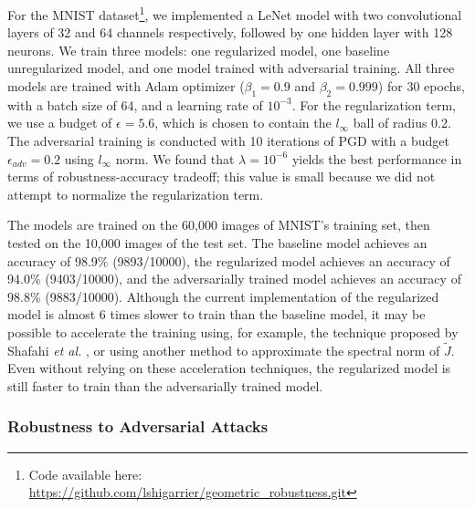 \documentclass[entropy,article,submit,pdftex,moreauthors]{Definitions/mdpi}
\theoremstyle{plain}
\theoremstyle{definition}
\begin{document}
For the MNIST dataset\footnote{Code available here: \url{https://github.com/lshigarrier/geometric_robustness.git}}, we implemented a LeNet model with two convolutional layers of 32 and 64 channels respectively, followed by one hidden layer with 128 neurons. We train three models: one regularized model, one baseline unregularized model, and one model trained with adversarial training. All three models are trained with Adam optimizer ($\beta_1=0.9$ and $\beta_2=0.999$) for 30 epochs, with a batch size of 64, and a learning rate of $10^{-3}$. For the regularization term, we use a budget of $\epsilon=5.6$, which is chosen to contain the $l_\infty$ ball of radius 0.2. The adversarial training is conducted with 10 iterations of PGD with a budget $\epsilon_{adv}=0.2$ using $l_\infty$ norm. We found that $\lambda = 10^{-6}$ yields the best performance in terms of robustness-accuracy tradeoff; this value is small because we did not attempt to normalize the regularization term.


The models are trained on the 60,000 images of MNIST's training set, then tested on the 10,000 images of the test set. The baseline model achieves an accuracy of 98.9\% (9893/10000), the regularized model achieves an accuracy of 94.0\% (9403/10000), and the adversarially trained model achieves an accuracy of 98.8\% (9883/10000). Although the current implementation of the regularized model is almost 6 times slower to train than the baseline model, it may be possible to accelerate the training using, for example, the technique proposed by Shafahi \emph{et al.} \citep{shafahiAdversarialTrainingFree2019}, or using another method to approximate the spectral norm of $\widetilde{J}$. Even without relying on these acceleration techniques, the regularized model is still faster to train than the adversarially trained model.

\subsubsection{Robustness to Adversarial Attacks}
\end{document}
